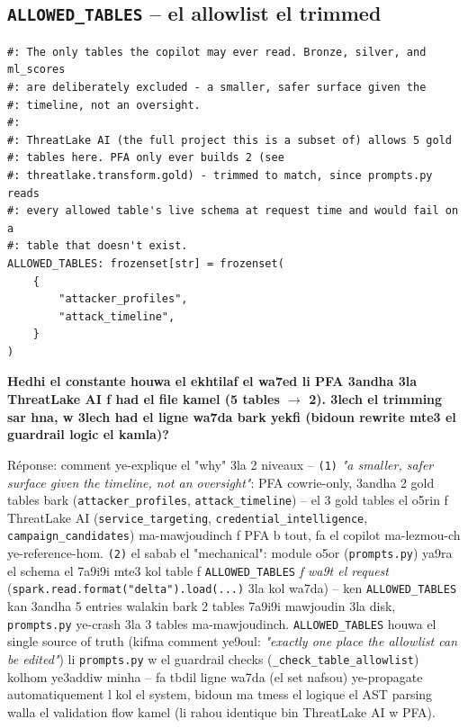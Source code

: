 \documentclass[11pt,a4paper]{report}
\DeclareRobustCommand{\code}[1]{\texttt{#1}}
\begin{document}
\subsection{\code{ALLOWED\_TABLES} -- el allowlist el trimmed}

\begin{lstlisting}[style=pystyle]
#: The only tables the copilot may ever read. Bronze, silver, and ml_scores
#: are deliberately excluded - a smaller, safer surface given the
#: timeline, not an oversight.
#:
#: ThreatLake AI (the full project this is a subset of) allows 5 gold
#: tables here. PFA only ever builds 2 (see
#: threatlake.transform.gold) - trimmed to match, since prompts.py reads
#: every allowed table's live schema at request time and would fail on a
#: table that doesn't exist.
ALLOWED_TABLES: frozenset[str] = frozenset(
    {
        "attacker_profiles",
        "attack_timeline",
    }
)
\end{lstlisting}

\begin{soual}
\textbf{Hedhi el constante houwa el ekhtilaf el wa7ed li PFA 3andha 3la
ThreatLake AI f had el file kamel (5 tables $\to$ 2). 3lech el trimming
sar hna, w 3lech had el ligne wa7da bark yekfi (bidoun rewrite mte3 el
guardrail logic el kamla)?}

Réponse: comment ye-explique el "why" 3la 2 niveaux -- \code{(1)}
\emph{"a smaller, safer surface given the timeline, not an oversight"}:
PFA cowrie-only, 3andha 2 gold tables bark (\code{attacker\_profiles},
\code{attack\_timeline}) -- el 3 gold tables el o5rin f ThreatLake AI
(\code{service\_targeting}, \code{credential\_intelligence},
\code{campaign\_candidates}) ma-mawjoudinch f PFA b tout, fa el copilot
ma-lezmou-ch ye-reference-hom. \code{(2)} el sabab el "mechanical": module
o5or (\code{prompts.py}) ya9ra el schema el 7a9i9i mte3 kol table f
\code{ALLOWED\_TABLES} \emph{f wa9t el request} (\code{spark.read.format("delta").load(...)}
3la kol wa7da) -- ken \code{ALLOWED\_TABLES} kan 3andha 5 entries walakin
bark 2 tables 7a9i9i mawjoudin 3la disk, \code{prompts.py} ye-crash 3la
3 tables ma-mawjoudinch. \code{ALLOWED\_TABLES} houwa el single source
of truth (kifma comment ye9oul: \emph{"exactly one place the allowlist
can be edited"}) li \code{prompts.py} w el guardrail checks (\code{\_check\_table\_allowlist})
kolhom ye3addiw minha -- fa tbdil ligne wa7da (el set nafsou) ye-propagate
automatiquement l kol el system, bidoun ma tmess el logique el AST parsing
walla el validation flow kamel (li rahou identique bin ThreatLake AI w
PFA).
\end{soual}
\end{document}
